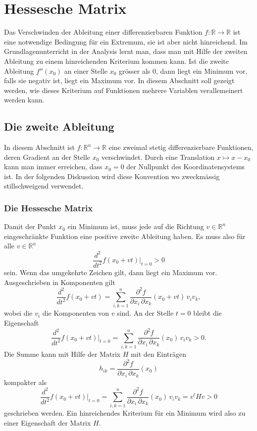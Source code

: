 %
%
%
\section{Hessesche Matrix
\label{buch:fuvar:section:hessesche}}
Das Verschwinden der Ableitung einer differenzierbaren Funktion
$f\colon\mathbb{R}\to\mathbb{R}$ ist eine notwendige Bedingung
für ein Extremum, sie ist aber nicht hinreichend.
Im Grundlagenunterricht in der Analysis lernt man, dass man mit
Hilfe der zweiten Ableitung zu einem hinreichenden Kriterium
kommen kann.
Ist die zweite Ableitung $f''(x_0)$ an einer Stelle $x_0$ grösser
als $0$, dann liegt ein Minimum vor, falls sie negativ ist, liegt
ein Maximum vor.
In diesem Abschnitt soll gezeigt werden, wie dieses Kriterium auf
Funktionen mehrere Variablen verallemeinert werden kann.

%
%
\subsection{Die zweite Ableitung}
In diesem Abschnitt ist $f\colon\mathbb{R}^n\to\mathbb{R}$
eine zweimal stetig differenzierbare Funktionen, deren Gradient
an der Stelle $x_0$ verschwindet.
Durch eine Translation $x\mapsto x-x_0$ kann man immer erreichen,
dass $x_0=0$ der Nullpunkt des Koordinatensystems ist.
In der folgenden Diskussion wird diese Konvention wo zweckmässig
stillschweigend verwendet.

%
%
\subsubsection{Die Hessesche Matrix}
Damit der Punkt $x_0$ ein Minimum ist, muss jede auf die Richtung
$v\in\mathbb{R}^n$ eingeschränkte Funktion eine positive zweite
Ableitung haben.
Es muss also für alle $v\in\mathbb{R}^n$
\[
\frac{d^2}{dt^2} f(x_0+vt)\bigg|_{t=0}
> 0
\]
sein.
Wenn das umgekehrte Zeichen gilt, dann liegt ein Maximum vor.
Ausgeschrieben in Komponenten gilt
\[
\frac{d^2}{dt^2} f(x_0+vt)
=
\sum_{i,k=1}^n
\frac{\partial^2 f}{\partial x_i\,\partial x_k}(x_0+vt)
\,
v_iv_k,
\]
wobei die $v_i$ die Komponenten von $v$ sind.
An der Stelle $t=0$ bleibt die Eigenschaft
\[
\frac{d^2}{dt^2}f(x_0+vt)\bigg|_{t=0}
=
\sum_{i,k=1}^n \frac{\partial^2 f}{\partial x_i\,\partial x_k}(x_0) \,v_iv_k
>
0.
\]
Die Summe kann mit Hilfe der Matrix $H$ mit den Einträgen
\[
h_{ik}
=
\frac{\partial^2 f}{\partial x_i\,\partial x_k}(x_0)
\]
kompakter als
\[
\frac{d^2}{dt^2}f(x_0+vt)\bigg|_{t=0}
=
\sum_{i,k=1}^n \frac{\partial^2 f}{\partial x_i\,\partial x_k}(x_0) \,v_iv_k
=
v^tHv
>
0
\]
geschrieben werden.
Ein hinreichendes Kriterium für ein Minimum wird also zu einer
Eigenschaft der Matrix $H$.

